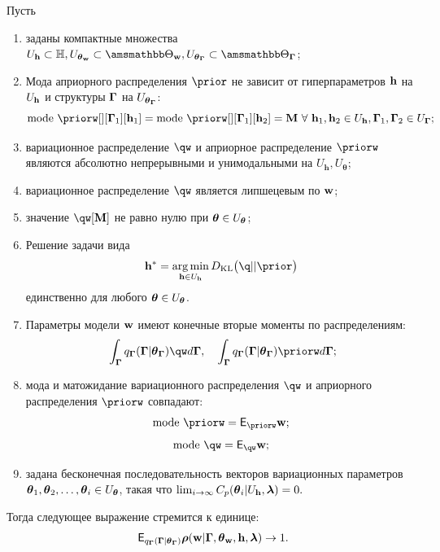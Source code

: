 \begin{theorem}
Пусть
\begin{enumerate}
\item заданы компактные множества $\Uh \subset \Hb, \Utetaw \subset \Tetawb, \UtetaG \subset \TetaGb$;


\item Мода априорного распределения $\prior$ не зависит от гиперпараметров $\mathbf{h}$  на $U_{\mathbf{h}}$ и структуры $\boldsymbol{\Gamma}$ на $U_{\boldsymbol{\theta}_{\boldsymbol{\Gamma}}}$:
\[
\text{mode}~\priorw[][\G_1][\h_1]=\text{mode}~\priorw[][\G_1][\h_2]=\mathbf{M}~\forall~\h_1,\h_2 \in \Uh, \G_1,\G_2 \in \UG;
\]

\item вариационное распределение $\qw$ и априорное распределение $\priorw$  являются абсолютно непрерывными и унимодальными на  $U_\mathbf{h}, U_{\boldsymbol{\theta}}$;

\item вариационное распределение $\qw$ является липшецевым по $\mathbf{w}$;

\item значение $\qw[\mathbf{M}]$ не равно нулю при $\boldsymbol{\theta} \in U_{\boldsymbol{\theta}}$;

\item Решение задачи вида 
\begin{equation}
\label{eq:dkl_solve}
\h^{*} = \argmin_{\h \in \Uh} \KL{\q}{\prior}
\end{equation} единственно для любого $\boldsymbol{\theta} \in U_{\boldsymbol{\theta}}$.
\item Параметры модели $\mathbf{w}$ имеют конечные вторые моменты по распределениям:
\[
   \int_{\G}\qG\qw d\G, \quad \int_{\G}\qG\priorw d\G;
\]

\item мода и матожидание вариационного распределения $\qw$ и априорного распределения $\priorw$  совпадают:
\[
    \text{mode}~\priorw= \E_{\priorw} \w;
\]
\[
  \text{mode}~\qw = \E_{\qw} \w;
\]

\item задана  бесконечная последовательность векторов вариационных параметров $\boldsymbol{\theta}_1,\boldsymbol{\theta}_2,\dots,\boldsymbol{\theta}_i \in U_{\boldsymbol{\theta}}$, такая что $\lim_{i \to \infty}C_p(\boldsymbol{\theta}_i|U_{\mathbf{h}},\boldsymbol{\lambda}) = 0.$

\end{enumerate}
Тогда следующее выражение стремится к единице:
\[
   \E_{\qG} \boldsymbol{\rho}(\w|\G, \tetaw, \h, \lam) \to 1.
\]


\end{theorem}

